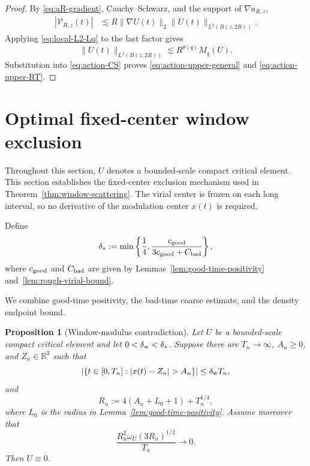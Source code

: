 \documentclass[preprint,12pt]{elsarticle}
\numberwithin{equation}{section}
\newtheorem{proposition}[theorem]{Proposition}
\theoremstyle{remark}
\newcommand{\R}{\mathbb R}
\newcommand{\Vcal}{\mathcal V}
\begin{document}
\begin{proof}
By \eqref{eq:aR-gradient}, Cauchy--Schwarz, and the support of $\nabla a_{R,z}$,
\begin{align}
  |\Vcal_{R,z}(t)|
  &\lesssim R\|\nabla U(t)\|_2
  \|U(t)\|_{L^2(B(z,2R))}.
  \label{eq:action-CS}
\end{align}
Applying \eqref{eq:local-L2-Lq} to the last factor gives
\begin{equation*}
  \|U(t)\|_{L^2(B(z,2R))}
  \lesssim R^{\theta(q)}M_q(U).
\end{equation*}
Substitution into \eqref{eq:action-CS} proves \eqref{eq:action-upper-general} and \eqref{eq:action-upper-RT}.
\end{proof}



\section{Optimal fixed-center window exclusion}

Throughout this section, $U$ denotes a bounded-scale compact critical element. This section establishes the fixed-center exclusion mechanism used in Theorem~\ref{thm:window-scattering}. The virial center is frozen on each long interval, so no derivative of the modulation center $x(t)$ is required.

Define
\begin{equation}\label{eq:delta-star-definition}
  \delta_*:=\min\left\{\frac14,
  \frac{c_{\rm good}}{3c_{\rm good}+C_{\rm bad}}\right\},
\end{equation}
where $c_{\rm good}$ and $C_{\rm bad}$ are given by Lemmas~\ref{lem:good-time-positivity} and~\ref{lem:rough-virial-bound}.

We combine good-time positivity, the bad-time coarse estimate, and the density endpoint bound.

\begin{proposition}[Window-modulus contradiction]\label{prop:window-modulus}
Let $U$ be a bounded-scale compact critical element and let $0<\delta_{\rm w}<\delta_*$. Suppose there are $T_n\to\infty$, $A_n\ge0$, and $Z_n\in\R^3$ such that
\begin{equation*}
  \left|\{t\in[0,T_n]:|x(t)-Z_n|>A_n\}\right|
  \le\delta_{\rm w}T_n,
\end{equation*}
and
\begin{equation}\label{eq:window-Rn}
  R_n:=4(A_n+L_0+1)+T_n^{1/4},
\end{equation}
where $L_0$ is the radius in Lemma~\ref{lem:good-time-positivity}. Assume moreover that
\begin{equation}\label{eq:window-modulus-compatibility}
  \frac{R_n^2\omega_U(3R_n)^{1/2}}{T_n}\longrightarrow0.
\end{equation}
Then $U\equiv0$.
\end{proposition}
\end{document}
